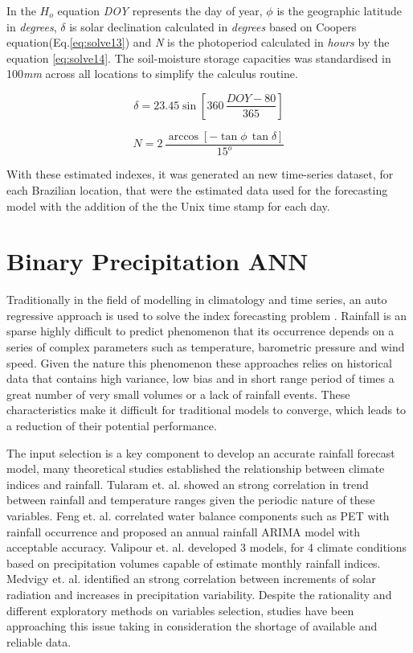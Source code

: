 In the $H_o$ equation \textit{DOY} represents the day of year, $\phi$ is the geographic latitude in \textit{degrees}, $\delta$ is solar declination calculated in \textit{degrees} 
based on Coopers\cite{cooper1969absorption} equation(Eq.\ref{eq:solve13}) and
\textit{N} is the photoperiod calculated in \textit{hours} by the equation \ref{eq:solve14}. The soil-moisture storage capacities was standardised in 100\textit{mm} across all locations to simplify the calculus routine.

\begin{equation}
 \label{eq:solve13}
 \delta = 23.45 \sin[360 \, \frac{DOY - 80}{365}]
\end{equation}

\begin{equation}
\label{eq:solve14}
N = 2 \, \frac{\arccos[-\tan\phi \, \tan\delta]}{15^o} 
\end{equation}

With these estimated indexes, it was generated an new time-series dataset, for each Brazilian location, that were the estimated data used for the forecasting model with the addition of the the Unix time stamp for each day.

\section{Binary Precipitation ANN}
\label{sec:linux}

Traditionally in the field of modelling in climatology and time series, an auto regressive approach is used to solve the index forecasting problem \cite{rajurkar2002artificial, mishra2018rainfall, ramirez2006linear}. Rainfall is an sparse highly difficult to predict phenomenon that its occurrence depends on a series of complex parameters such as temperature, barometric pressure and wind speed\cite{sumi2012rainfall}. Given the nature this phenomenon these approaches relies on historical data that contains high variance, low bias and in short range period of times a great number of very small volumes or a lack of rainfall events. These characteristics make it difficult for traditional models to converge, which leads to a reduction of their potential performance.

The input selection is a key component to develop an accurate rainfall forecast model, many theoretical studies established the relationship between climate indices and rainfall. Tularam et. al.\cite{tularam2010time} showed an strong correlation in trend between rainfall and temperature ranges given the periodic nature of these variables. Feng et. al. \cite{feng2016trend} correlated water balance components such as PET with rainfall occurrence and proposed an annual rainfall ARIMA model with acceptable accuracy. Valipour et. al. \cite{valipour2016much} developed 3 models, for 4 climate conditions based on precipitation volumes capable of estimate monthly rainfall indices. Medvigy et. al.\cite{medvigy2012trends} identified an strong correlation between increments of solar radiation and increases in precipitation variability. Despite the rationality and different exploratory methods on variables selection, studies have been approaching this issue taking in consideration the shortage of available and reliable data.

